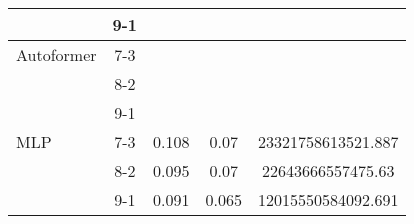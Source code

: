 \begin{table}[h!]
\begin{tabular}{|l|c|c|c|c|}
    \rowcolor{green!30}  & 9-1 &  &  &  \\ \hline
    \rowcolor{white} Autoformer & 7-3 &  &  &  \\ \hline
    \rowcolor{white}  & 8-2 &  &  &  \\ \hline
    \rowcolor{white}  & 9-1 &  &  &  \\ \hline
    \rowcolor{white} MLP & 7-3 & 0.108 & 0.07 & 23321758613521.887 \\ \hline
    \rowcolor{white}  & 8-2 & 0.095 & 0.07 & 22643666557475.63 \\ \hline
    \rowcolor{white}  & 9-1 & 0.091 & 0.065 & 12015550584092.691 \\ \hline
    \end{tabular}
    \end{table}